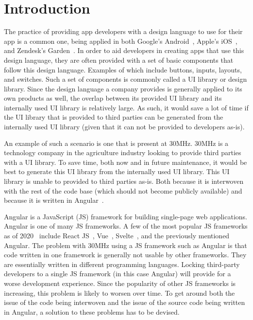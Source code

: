 \chapter{Introduction}
The practice of providing app developers with a design language to use for their app is a common one, being applied in both Google's Android~, Apple's iOS~, and Zendesk's Garden~. In order to aid developers in creating apps that use this design language, they are often provided with a set of basic components that follow this design language. Examples of which include buttons, inputs, layouts, and switches. Such a set of components is commonly called a UI library or design library. Since the design language a company provides is generally applied to its own products as well, the overlap between its provided UI library and its internally used UI library is relatively large. As such, it would save a lot of time if the UI library that is provided to third parties can be generated from the internally used UI library (given that it can not be provided to developers as-is).

An example of such a scenario is one that is present at 30MHz. 30MHz is a technology company in the agriculture industry looking to provide third parties with a UI library. To save time, both now and in future maintenance, it would be best to generate this UI library from the internally used UI library. This UI library is unable to provided to third parties as-is. Both because it is interwoven with the rest of the code base (which should not become publicly available) and because it is written in Angular~.

Angular is a JavaScript (JS) framework for building single-page web applications. Angular is one of many JS frameworks. A few of the most popular JS frameworks as of 2020~ include React JS~, Vue~, Svelte~, and the previously mentioned Angular. The problem with 30MHz using a JS framework such as Angular is that code written in one framework is generally not usable by other frameworks. They are essentially written in different programming languages. Locking third-party developers to a single JS framework (in this case Angular) will provide for a worse development experience. Since the popularity of other JS frameworks is increasing, this problem is likely to worsen over time. To get around both the issue of the code being interwoven and the issue of the source code being written in Angular, a solution to these problems has to be devised.

